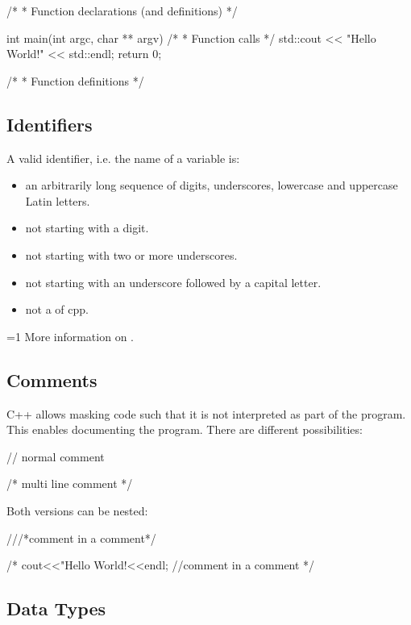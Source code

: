 \documentclass[10pt,a4paper]{scrartcl}
\gdef\conditionmacro{1}
\begin{document}
\begin{multicols*}{2}
\begin{TPCpp}
/*
 * Function declarations (and definitions)
 */

int main(int argc, char ** argv)
{
	  /*
	   * Function calls
	   */
    std::cout << "Hello World!" << std::endl;
    return 0;
}

/*
 * Function definitions
 */
\end{TPCpp}

\subsection{Identifiers}

A valid identifier, i.e. the name of a variable is:

\begin{itemize}
\item an arbitrarily long sequence of digits, underscores, lowercase and uppercase Latin letters.
\item not starting with a digit.
\item not starting with two or more underscores.
\item not starting with an underscore followed by a capital letter.
\item not a  of cpp.
\end{itemize}

\ifnum\conditionmacro=1
More information on .
\fi

\subsection{Comments}

C++ allows masking code such that it is not interpreted as part of the program. This enables documenting the program. There are different possibilities:

\begin{TPCpp}
// normal comment

/*
multi
line
comment
*/
\end{TPCpp}

Both versions can be nested:

\begin{TPCpp}
///*comment in a comment*/

/*
cout<<"Hello World!<<endl; //comment in a comment
*/
\end{TPCpp}

\subsection{Data Types}


\end{multicols*}
\end{document}
